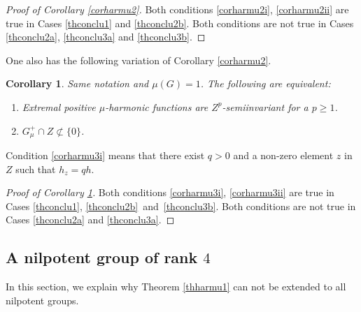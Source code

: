 \documentclass[JEP,XML,SOM,Unicode]{cedram}
\newenvironment{enumeratei}
{\bgroup\def\theenumi{\roman{enumi}}\def\theenumii{\arabic{enumii}}\begin{enumerate}}
{\end{enumerate}\egroup}
\newtheorem{Cor}[Thm]{Corollary}
\theoremstyle{definition}
\let\bq\relax
\let\eq\relax
\begin{document}
\begin{proof}[Proof of Corollary \ref{corharmu2}]
Both conditions \eqref{corharmu2i}, \eqref{corharmu2ii}
are true in Cases \eqref{thconclu1} and \eqref{thconclu2b}.
Both conditions
are not true in Cases \eqref{thconclu2a}, \eqref{thconclu3a} and \eqref{thconclu3b}.
\end{proof}

One also has the following variation of Corollary \ref{corharmu2}.

\begin{Cor}
\label{corharmu3}
Same notation and $\mu(G)=1$.
The following are equivalent:
\begin{enumeratei}
\item\label{corharmu3i}
Extremal positive $\mu$-harmonic functions are $Z^{p}$-semiinvariant
for a $p\geq 1$.
\item\label{corharmu3ii}
$G_\mu^+\cap Z\not\subset\{0\}$.
\end{enumeratei}
\end{Cor}

Condition \eqref{corharmu3i} means that there exist $q>0$ and a non-zero element $z$ in $Z$
such that $h_z=qh$.

\begin{proof}[Proof of Corollary \ref{corharmu3}]
Both conditions \eqref{corharmu3i}, \eqref{corharmu3ii}
are true in Cases \eqref{thconclu1}, \eqref{thconclu2b}~and~\eqref{thconclu3b}.
Both conditions
are not true in Cases \eqref{thconclu2a} and \eqref{thconclu3a}.
\end{proof}

\subsection{A nilpotent group of rank $4$}
\label{secrankfour}

\bq
In this section, we explain why Theorem \ref{thharmu1}
can not be extended to all nilpotent groups.
\eq
\end{document}
